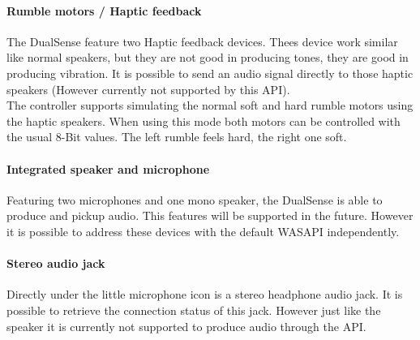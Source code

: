 \paragraph{Rumble motors / Haptic feedback}
The DualSense feature two Haptic feedback devices. Thees device work similar like normal speakers, but they are not good in producing tones, they are good in producing vibration. It is possible to send an audio signal directly to those haptic speakers (However currently not supported by this API).\\
The controller supports simulating the normal soft and hard rumble motors using the haptic speakers. When using this mode both motors can be controlled with the usual 8-Bit values. The left rumble feels hard, the right one soft.

\paragraph{Integrated speaker and microphone}
Featuring two microphones and one mono speaker, the DualSense is able to produce and pickup audio. This features will be supported in the future. However it is possible to address these devices with the default WASAPI independently. 

\paragraph{Stereo audio jack}
Directly under the little microphone icon is a stereo headphone audio jack. It is possible to retrieve the connection status of this jack. However just like the speaker it is currently not supported to produce audio through the API.

\newpage